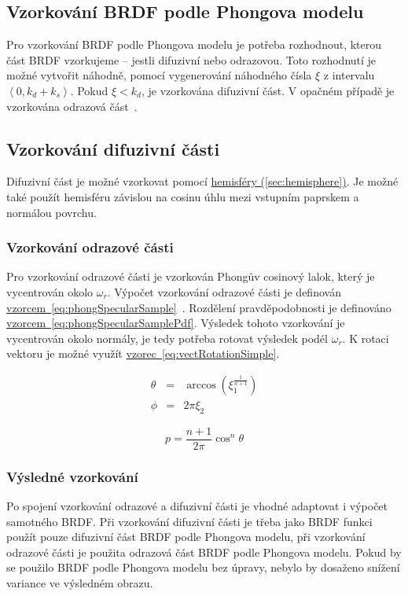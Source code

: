 \documentclass[czech,master]{diploma}
\newcommand{\intervalcc}[2]{\left<{{#1},{#2}}\right>}
\newcommand{\refl}{\omega_{r}}
\newcommand{\randU}{\xi_{1}}
\newcommand{\randV}{\xi_{2}}
\begin{document}
\subsection{Vzorkování BRDF podle Phongova modelu} \label{sec:phongSampling}
Pro vzorkování BRDF podle Phongova modelu je potřeba rozhodnout, kterou část BRDF vzorkujeme -- jestli difuzivní nebo odrazovou. Toto rozhodnutí je možné vytvořit náhodně, pomocí vygenerování náhodného čísla \(\xi\) z intervalu \(\intervalcc{0}{k_d+k_s}\). Pokud \(\xi < k_d\), je vzorkována difuzivní část. V opačném případě je vzorkována odrazová část~\cite{KrivanekBRDFIBL}.
\subsection{Vzorkování difuzivní části}
Difuzivní část je možné vzorkovat pomocí \hyperref[sec:hemisphere]{hemisféry (\ref{sec:hemisphere})}. Je možné také použít hemisféru závislou na cosinu úhlu mezi vstupním paprskem a normálou povrchu.

\subsubsection*{Vzorkování odrazové části}
Pro vzorkování odrazové části je vzorkován Phongův cosinový lalok, který je vycentrován okolo \(\refl\). Výpočet vzorkování odrazové části je definován \hyperref[eq:phongSpecularSample]{vzorcem~\ref{eq:phongSpecularSample}}~\cite{KrivanekBRDFIBL}. Rozdělení pravděpodobnosti je definováno \hyperref[eq:phongSpecularSamplePdf]{vzorcem~\ref{eq:phongSpecularSamplePdf}}.
Výsledek tohoto vzorkování je vycentrován okolo normály, je tedy potřeba rotovat výsledek podél \(\refl\). K rotaci vektoru je možné využít \hyperref[eq:vectRotationSimple]{vzorec~\ref{eq:vectRotationSimple}}.

\begin{eqnarray}
  \theta & = & \arccos(\randU^{\frac{1}{n+1}}) \nonumber \\
  \phi & = & 2\pi\randV\label{eq:phongSpecularSample}
\end{eqnarray}

\begin{equation} \label{eq:phongSpecularSamplePdf}
  p = \frac{n+1}{2\pi}\cos^n\theta
\end{equation}

\subsubsection*{Výsledné vzorkování}
Po spojení vzorkování odrazové a difuzivní části je vhodné adaptovat i výpočet samotného BRDF\@. Při vzorkování difuzivní části je třeba jako BRDF funkci použít pouze difuzivní část BRDF podle Phongova modelu, při vzorkování odrazové části je použita odrazová část BRDF podle Phongova modelu\@. Pokud by se použilo BRDF podle Phongova modelu bez úpravy, nebylo by dosaženo snížení variance ve výsledném obrazu.~\cite{KrivanekBRDFIBL}
\end{document}
